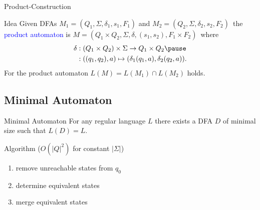 \documentclass{beamer}
\def\padding{\vspace{0.5cm}}
\def\b{\textcolor{blue}}
\begin{document}
\begin{frame}{Product-Construction}
    \begin{block}{Idea}
        Given DFAs $M_1 = (Q_1, \Sigma, \delta_1, s_1, F_1)$ and $M_2 = (Q_2, \Sigma, \delta_2, s_2, F_2)$\pause\ the \b{product automaton} is $M = (Q_1 \times Q_2, \Sigma, \delta, (s_1, s_2), F_1 \times F_2)$\pause\ where
        \begin{align*}
            \delta &: (Q_1 \times Q_2) \times \Sigma \to Q_1 \times Q_2 \pause\\
                   &: ((q_1, q_2), a) \mapsto (\delta_1(q_1, a), \delta_2(q_2, a)).
        \end{align*}\pause\padding
        For the product automaton $L(M) = L(M_1) \cap L(M_2)$ holds.
    \end{block}
\end{frame}

\subsection{Minimal Automaton}

\begin{frame}{Minimal Automaton}
    For any regular language $L$ there exists a DFA $D$ of minimal size such that $L(D) = L$.\pause
    \begin{block}{Algorithm ($O(|Q|^2)$ for constant $|\Sigma|$)}
        \begin{enumerate}
            \item remove unreachable states from $q_0$\pause
            \item determine equivalent states\pause
            \item merge equivalent states
        \end{enumerate}
    \end{block}
\end{frame}
\end{document}
